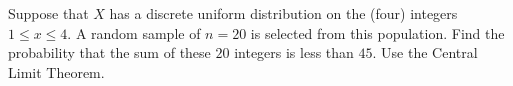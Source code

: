 Suppose that $X$ has a discrete uniform distribution on the (four) integers $1 \leq x \leq 4$.
A random sample of $n = 20$ is selected from this population.
Find the probability that the sum of these $20$ integers is less than $45$. 
Use the Central Limit Theorem.